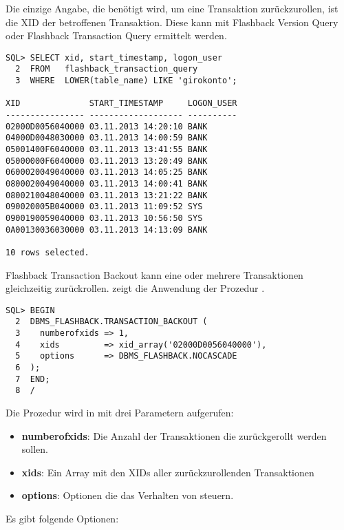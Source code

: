           Die einzige Angabe, die benötigt wird, um eine Transaktion zurückzurollen, ist die XID der betroffenen Transaktion. Diese kann mit Flashback Version Query oder Flashback Transaction Query ermittelt werden.
          \begin{lstlisting}[caption={Die XID einer Transaktion ermitteln},label=admin1712,language=oracle_sql]
SQL> SELECT xid, start_timestamp, logon_user
  2  FROM   flashback_transaction_query
  3  WHERE  LOWER(table_name) LIKE 'girokonto';

XID              START_TIMESTAMP     LOGON_USER
---------------- ------------------- ----------
02000D0056040000 03.11.2013 14:20:10 BANK
04000D0048030000 03.11.2013 14:00:59 BANK
05001400F6040000 03.11.2013 13:41:55 BANK
05000000F6040000 03.11.2013 13:20:49 BANK
0600020049040000 03.11.2013 14:05:25 BANK
0800020049040000 03.11.2013 14:00:41 BANK
0800210048040000 03.11.2013 13:21:22 BANK
090020005B040000 03.11.2013 11:09:52 SYS
0900190059040000 03.11.2013 10:56:50 SYS
0A00130036030000 03.11.2013 14:13:09 BANK

10 rows selected.
          \end{lstlisting}
          Flashback Transaction Backout kann eine oder mehrere Transaktionen gleichzeitig zurückrollen.  zeigt die Anwendung der Prozedur .
          \begin{lstlisting}[caption={Eine bestätigte Transaktion zurückrollen},label=admin1713,language=plsql]
SQL> BEGIN
  2  DBMS_FLASHBACK.TRANSACTION_BACKOUT (
  3    numberofxids => 1,
  4    xids         => xid_array('02000D0056040000'),
  5    options      => DBMS_FLASHBACK.NOCASCADE
  6  );
  7  END;
  8  /
          \end{lstlisting}
          Die Prozedur  wird in  mit drei Parametern aufgerufen:
          \begin{itemize}
            \item \textbf{numberofxids}: Die Anzahl der Transaktionen die zurückgerollt werden sollen.
            \item \textbf{xids}: Ein Array mit den XIDs aller zurückzurollenden Transaktionen
            \item \textbf{options}: Optionen die das Verhalten von  steuern.
          \end{itemize}
\clearpage
          Es gibt folgende Optionen:

